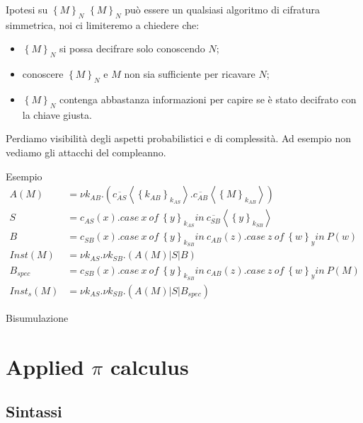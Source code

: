 \documentclass{beamer}
\theoremstyle{plain}
\theoremstyle{definition}
\theoremstyle{remark}
\newcommand{\obar}[1]{\overline{#1}}
\newcommand{\set}[1]{\left\{#1\right\}}
\newcommand{\pa}[1]{\left(#1\right)}
\newcommand{\ang}[1]{\left<#1\right>}
\begin{document}
\begin{frame}{Ipotesi su $\set{M}_N$}
  $\set{M}_N$ pu\`o essere un qualsiasi algoritmo di cifratura simmetrica,
  noi ci limiteremo a chiedere che:
  \begin{itemize}
  \item $\set{M}_N$ si possa decifrare solo conoscendo $N$;
  \item conoscere $\set{M}_N$ e $M$ non sia sufficiente per ricavare $N$;
  \item $\set{M}_N$ contenga abbastanza informazioni per capire se \`e stato
    decifrato con la chiave giusta.
  \end{itemize}
  \vfill

  Perdiamo visibilit\`a degli aspetti probabilistici e di
  complessit\`a. Ad esempio non vediamo gli attacchi del compleanno.
\end{frame}

\begin{frame}{Esempio}
  \begin{align*}
    A(M) & = \nu k_{AB}. \pa{
           \obar{c_{AS}}\ang{\set{k_{AB}}_{k_{AS}}}. \obar{c_{AB}}\ang{\set{M}_{k_{AB}}}}
    \\
    S & = c_{AS}(x).case\ x\ of\ \set{y}_{k_{AS}}in\ 
        \obar{c_{SB}}\ang{\set{y}_{k_{SB}}} \\ 
    B & = c_{SB}(x).case\ x\ of\ \set{y}_{k_{SB}}in\ c_{AB}(z). case\
        z\ of\ \set{w}_y in\ P(w) \\ 
    Inst(M) & = \nu k_{AS}. \nu k_{SB}. \pa{ A(M) | S | B } \\
    B_{spec} & = c_{SB}(x).case\ x\ of\ \set{y}_{k_{SB}}in\ 
               c_{AB}(z). case\ z\ of\ \set{w}_y in\ P(M) \\
    Inst_{s}(M) & = \nu k_{AS}. \nu k_{SB}. \pa{ A(M) | S | B_{spec}}
  \end{align*}
\end{frame}


\begin{frame}{Bisumulazione}
  
\end{frame}


\section{Applied $\pi$ calculus}

\subsection{Sintassi}
\end{document}
